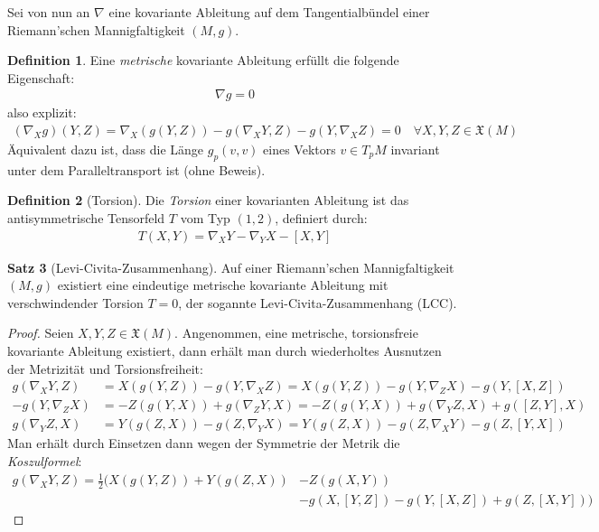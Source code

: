 \documentclass[a4paper]{scrreprt}
\numberwithin{equation}{chapter}
\newcommand{\vf}{\mathfrak{X}}
\theoremstyle{definition}
\newtheorem{defn}{Definition}[section]
\newtheorem{satz}[defn]{Satz}
\begin{document}
		Sei von nun an $\nabla$ eine kovariante Ableitung auf dem Tangentialbündel einer Riemann'schen Mannigfaltigkeit $(M,g)$.
		\begin{defn}
			Eine \emph{metrische} kovariante Ableitung erfüllt die folgende Eigenschaft:
			\begin{align*}
				\nabla g=0
			\end{align*}
			also explizit:
			\begin{align*}
				(\nabla_X g)(Y,Z)=\nabla_X(g(Y,Z))-g(\nabla_XY,Z)-g(Y,\nabla_XZ)=0\quad\forall X,Y,Z\in\vf(M)
			\end{align*}
			Äquivalent dazu ist, dass die Länge $g_p(v,v)$ eines Vektors $v\in T_pM$ invariant unter dem Paralleltransport ist (ohne Beweis). 
		\end{defn}
		\begin{defn}[Torsion]
			Die \emph{Torsion} einer kovarianten Ableitung ist das antisymmetrische Tensorfeld $T$ vom Typ $(1,2)$, definiert durch:
			\begin{align*}
				T(X,Y)=\nabla_XY-\nabla_YX-\left[X,Y\right]
			\end{align*}
		\end{defn}
		
		\begin{satz}[Levi-Civita-Zusammenhang]
			Auf einer Riemann'schen Mannigfaltigkeit $(M,g)$ existiert eine eindeutige metrische kovariante Ableitung mit verschwindender Torsion $T=0$, der sogannte Levi-Civita-Zusammenhang (LCC).
			\begin{proof}
				Seien $X,Y,Z\in\vf(M)$. Angenommen, eine metrische, torsionsfreie kovariante Ableitung existiert, dann erhält man durch wiederholtes Ausnutzen der Metrizität und Torsionsfreiheit:
				\begin{align*}
				g(\nabla_XY,Z)&=X(g(Y,Z))-g(Y,\nabla_XZ)=X(g(Y,Z))-g(Y,\nabla_ZX)-g(Y,[X,Z])\\
				-g(Y,\nabla_ZX)&=-Z(g(Y,X))+g(\nabla_ZY,X)=-Z(g(Y,X))+g(\nabla_YZ,X)+g([Z,Y],X)\\
				g(\nabla_YZ,X)&=Y(g(Z,X))-g(Z,\nabla_YX)=Y(g(Z,X))-g(Z,\nabla_XY)-g(Z,[Y,X])
				\end{align*}
				Man erhält durch Einsetzen dann wegen der Symmetrie der Metrik die \emph{Koszulformel}:
				\begin{align*}
					g(\nabla_XY,Z)=\frac{1}{2}( X(g(Y,Z))+Y(g(Z,X))&-Z(g(X,Y))\\
					&-g(X,[Y,Z])-g(Y,[X,Z])+g(Z,[X,Y]))
				\end{align*}
				
			\end{proof}
		\end{satz}
		
\end{document}
